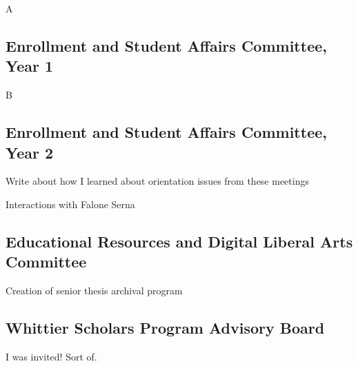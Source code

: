 \documentclass[../../../main.tex]{subfiles}
\begin{document}
A

\subsection{Enrollment and Student Affairs Committee, Year 1}

B

\subsection{Enrollment and Student Affairs Committee, Year 2}

Write about how I learned about orientation issues from these meetings

Interactions with Falone Serna

\subsection{Educational Resources and Digital Liberal Arts Committee}

Creation of senior thesis archival program

\subsection{Whittier Scholars Program Advisory Board}

I was invited!  Sort of.
\end{document}
